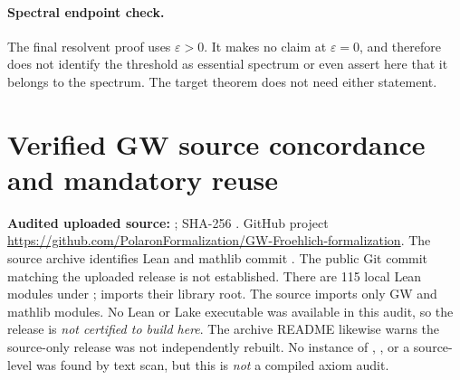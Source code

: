 \documentclass[11pt,a4paper]{article}
\theoremstyle{remark}\newtheorem{remark}[theorem]{Remark}
\begin{document}
\paragraph{Spectral endpoint check.}
The final resolvent proof uses $\varepsilon>0$. It makes no claim at $\varepsilon=0$, and therefore does not identify the threshold as essential spectrum or even assert here that it belongs to the spectrum. The target theorem does not need either statement.


\clearpage
\section{Verified GW source concordance and mandatory reuse}\label{sec:gwverify}
\noindent\textbf{Audited uploaded source:} ; SHA-256 . GitHub project \url{https://github.com/PolaronFormalization/GW-Froehlich-formalization}. The source archive identifies Lean  and mathlib commit . The public Git commit matching the uploaded release is not established. There are 115 local Lean modules under ;  imports their library root. The source imports only GW and mathlib modules. No Lean or Lake executable was available in this audit, so the release is \emph{not certified to build here}. The archive README likewise warns the source-only release was not independently rebuilt. No instance of , , or a source-level  was found by text scan, but this is \emph{not} a compiled axiom audit.
\end{document}
